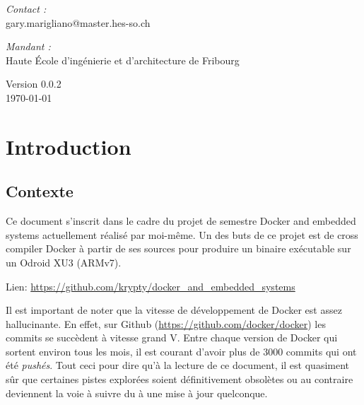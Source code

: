 \documentclass[11pt,a4paper,oneside]{report}
\newcommand{\school}{Haute École d'ingénierie et d'architecture de Fribourg}
\begin{document}
\begin{titlepage}
\begin{center}
\vfill

\noindent
\begin{minipage}{0.4\textwidth}
  \begin{flushleft} \large
    \emph{Contact :}\\
    gary.marigliano@master.hes-so.ch
  \end{flushleft}
\end{minipage}%
\begin{minipage}{0.4\textwidth}
  \begin{flushright} \large
    \emph{Mandant :} \\
    \school
  \end{flushright}
\end{minipage}

\vfill

{\large Version 0.0.2 \\ \today}

\end{center}
\end{titlepage}

\pagestyle{historystyle}
\begin{versionhistory}  
\end{versionhistory}


\tableofcontents
{}

\pagestyle{normal}

\chapter{Introduction}

\section{Contexte}\label{contexte}

Ce document s'inscrit dans le cadre du projet de semestre Docker and embedded systems actuellement réalisé par moi-même. Un des buts de ce projet est de cross compiler Docker à partir de ses sources pour produire un binaire exécutable sur un Odroid XU3 (ARMv7).

Lien: \url{https://github.com/krypty/docker_and_embedded_systems}

Il est important de noter que la vitesse de développement de Docker est assez hallucinante. En effet, sur Github (\url{https://github.com/docker/docker}) les commits se succèdent à vitesse grand V. Entre chaque version de Docker qui sortent environ tous les mois, il est courant d'avoir plus de 3000 commits qui ont été \emph{pushés}. Tout ceci pour dire qu'à la lecture de ce document, il est quasiment sûr que certaines pistes explorées soient définitivement obsolètes ou au contraire deviennent la voie à suivre du à une mise à jour quelconque.
\end{document}
